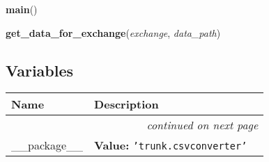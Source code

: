     \vspace{0.5ex}

\hspace{.8\funcindent}\begin{boxedminipage}{\funcwidth}

    \raggedright \textbf{main}()

\setlength{\parskip}{2ex}
\setlength{\parskip}{1ex}
    \end{boxedminipage}

    \label{trunk:csvconverter:yahoo_data_getter:get_data_for_exchange}

    \vspace{0.5ex}

\hspace{.8\funcindent}\begin{boxedminipage}{\funcwidth}

    \raggedright \textbf{get\_data\_for\_exchange}(\textit{exchange}, \textit{data\_path})

\setlength{\parskip}{2ex}
\setlength{\parskip}{1ex}
    \end{boxedminipage}



  \subsection{Variables}

    \vspace{-1cm}
\hspace{\varindent}\begin{longtable}{|p{\varnamewidth}|p{\vardescrwidth}|l}
\cline{1-2}
\cline{1-2} \centering \textbf{Name} & \centering \textbf{Description}& \\
\cline{1-2}
\endhead\cline{1-2}\multicolumn{3}{r}{\small\textit{continued on next page}}\\\endfoot\cline{1-2}
\endlastfoot\raggedright \_\-\_\-p\-a\-c\-k\-a\-g\-e\-\_\-\_\- & \raggedright \textbf{Value:} 
{\tt \texttt{'}\texttt{trunk.csvconverter}\texttt{'}}&\\
\cline{1-2}
\end{longtable}

